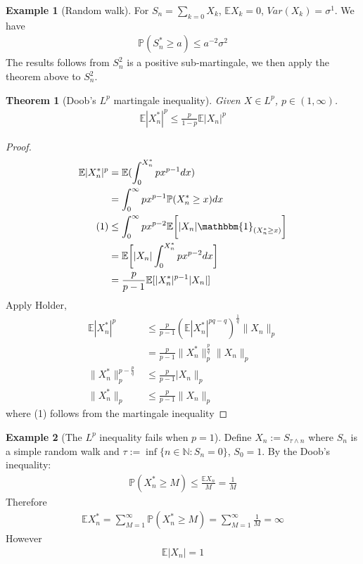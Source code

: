 \documentclass[a4paper,11pt]{book}
\newtheorem{theorem}{Theorem}[section]
\theoremstyle{definition}
\newtheorem*{example}{Example}
\theoremstyle{remark}
\begin{document}
\begin{example}[Random walk]
For $S_n = \sum_{k = 0} X_k$, $\mathbb{E}X_k = 0$, $Var(X_k) = \sigma^1$. We have
\begin{align*}
	\mathbb{P}(S^*_n \ge  a) \le a^{-2} \sigma^2
\end{align*}	
The results follows from $S^2_n$ is a positive sub-martingale, we then apply the theorem above to $S_n^2$.
\end{example}

\begin{theorem}[Doob's $L^p$ martingale inequality]
	Given $X \in L^p$, $p \in (1, \infty)$.
	\begin{align*}
		\mathbb{E}|X^*_n|^p \leq \frac{p}{1-p} \mathbb{E}|X_n|^p
	\end{align*}
\end{theorem}
\begin{proof}
	\begin{align*}
		\mathbb{E}|X_n^*|^p &= \mathbb{E}( \int_0^{X^*_n} px^{p-1} dx) \\
		&= \int_0^\infty px^{p-1} \mathbb{P}(X_n^* \ge x )dx\\
	(1)	&\leq \int_0^\infty px ^{p-2}  \mathbb{E}\bigg[|X_n| \mathbbm{1}_{(X_n^* \ge x)}\bigg]\\
		&= \mathbb{E}\bigg[ |X_n| \int_0^{X_n^*} px^{p-2}dx\bigg] \\
		&= \frac{p}{p-1}\mathbb{E}[|X_n^*|^{p-1}|X_n|]
	\end{align*}
	Apply Holder, 
	\begin{align*}
	\mathbb{E}|X_n^*|^p &\le  \frac{p}{p-1} (\mathbb{E}|X_n^*|^{pq - q})^{\frac{1}{q}} \|X_n\|_p\\
	&= \frac{p}{p-1} \|X_n^*\|_p^\frac{p}{q} \|X_n \|_p\\
	\|X_n^*\|_p^{p - \frac{p}{q}} &\leq \frac{p}{p-1}|X_n\|_p\\
	\|X_n^*\|_p &\leq \frac{p}{p-1}\|X_n\|_p
	\end{align*}
	where (1) follows from the martingale inequality
\end{proof}

\begin{example}[The $L^p$ inequality fails when $p = 1$]
Define $X_n:= S_{\tau \wedge n}$ where $S_n$ is a simple random walk and $\tau:= \inf \{n \in \mathbb{N} : S_n = 0 \} $, $S_0 = 1$. By the Doob's inequality:
\begin{align*}
	\mathbb{P}(X_n^* \geq M ) \le \frac{\mathbb{E}X_n}{M} = \frac{1}{M}
\end{align*}
Therefore
\begin{align*}
	\mathbb{E}X_n^* = \sum_{M = 1}^\infty \mathbb{P}(X_n^* \ge M) = \sum_{M = 1}^\infty \frac{1}{M} = \infty
\end{align*}
However
\begin{align*}
	\mathbb{E}|X_n| = 1
\end{align*}
\end{example}
\end{document}
